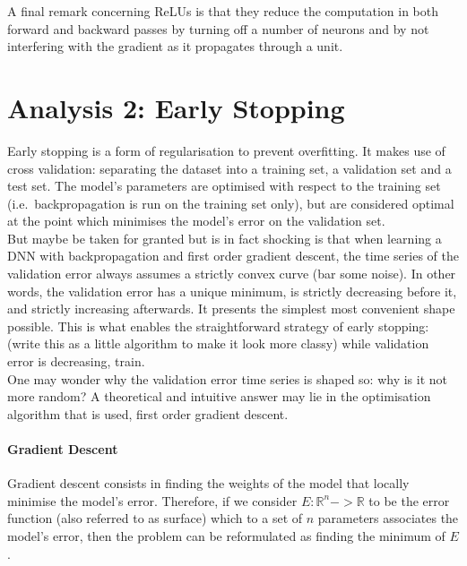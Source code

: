 \documentclass[a4paper,11pt]{article}
\begin{document}
A final remark concerning ReLUs is that they reduce the computation in both forward and backward passes by turning off a number of neurons and by not interfering with the gradient as it propagates through a unit. \\

\clearpage

\section{Analysis 2: Early Stopping}

Early stopping is a form of regularisation to prevent overfitting. It makes use of cross validation: separating the dataset into a training set, a validation set and a test set. The model's parameters are optimised with respect to the training set (i.e.\ backpropagation is run on the training set only), but are considered optimal at the point which minimises the model's error on the validation set. \\

But maybe be taken for granted but is in fact shocking is that when learning a DNN with backpropagation and first order gradient descent, the time series of the validation error always assumes a strictly convex curve (bar some noise). In other words, the validation error has a unique minimum, is strictly decreasing before it, and strictly increasing afterwards. It presents the simplest most convenient shape possible. This is what enables the straightforward strategy of early stopping: (write this as a little algorithm to make it look more classy) while validation error is decreasing, train. \\

One may wonder why the validation error time series is shaped so: why is it not more random? A theoretical and intuitive answer may lie in the optimisation algorithm that is used, first order gradient descent.

\paragraph{Gradient Descent}

Gradient descent consists in finding the weights of the model that locally minimise the model's error. Therefore, if we consider $E : \mathbb{R}^n -> \mathbb{R}$ to be the error function (also referred to as surface) which to a set of $n$ parameters associates the model's error, then the problem can be reformulated as finding the minimum of $E$. 
\end{document}
